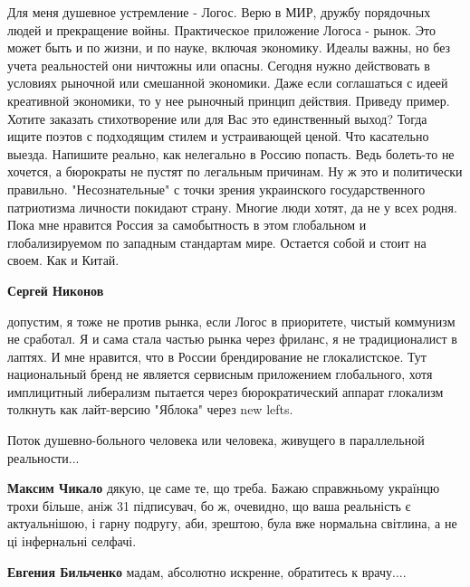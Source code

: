 \begin{itemize}
\begin{itemize}
\end{itemize} %


Для меня душевное устремление - Логос. Верю в МИР, дружбу порядочных людей и
прекращение войны. Практическое приложение Логоса - рынок. Это может быть и по
жизни, и по науке, включая экономику. Идеалы важны, но без учета реальностей
они ничтожны или опасны. Сегодня нужно действовать в условиях рыночной или
смешанной экономики. Даже если соглашаться с идеей креативной экономики, то у
нее рыночный принцип действия. Приведу пример. Хотите заказать стихотворение
или для Вас это единственный выход? Тогда ищите поэтов с подходящим стилем и
устраивающей ценой. Что касательно выезда. Напишите реально, как нелегально в
Россию попасть. Ведь болеть-то не хочется, а бюрократы не пустят по легальным
причинам. Ну ж это и политически правильно. "Несознательные" с точки зрения
украинского государственного патриотизма личности покидают страну. Многие люди
хотят, да не у всех родня. Пока мне нравится Россия за самобытность в этом
глобальном и глобализируемом по западным стандартам мире. Остается собой и
стоит на своем. Как и Китай.

\begin{itemize} %
\textbf{Сергей Никонов} 

допустим, я тоже не против рынка, если Логос в приоритете, чистый коммунизм не
сработал. Я и сама стала частью рынка через фриланс, я не традиционалист в
лаптях. И мне нравится, что в России брендирование не глокалистское. Тут
национальный бренд не является сервисным приложением глобального, хотя
имплицитный либерализм пытается через бюрократический аппарат глокализм
толкнуть как лайт-версию "Яблока" через new lefts.

\end{itemize} %


Поток душевно-больного человека или человека, живущего в параллельной реальности...

\begin{itemize} %
\textbf{Максим Чикало} дякую, це саме те, що треба. Бажаю справжньому українцю трохи більше, аніж 31 підписувач, бо ж, очевидно, що ваша реальність є актуальнішою, і гарну подругу, аби, зрештою, була вже нормальна світлина, а не ці інфернальні селфачі.

\textbf{Евгения Бильченко} мадам, абсолютно искренне, обратитесь к врачу....


\end{itemize}
\end{itemize}
